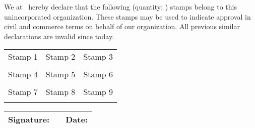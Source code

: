 \documentclass[11pt,a4paper]{article}
\newcommand{\stdsignaturearea}[0]{
    \parbox{\linewidth}{
        \tabcolsep=0pt
        \begin{tabu}{XXX}
            Signature: & & Date:\\
            \hline
        \end{tabu}
    }
}
\begin{document}
We at \uninctomldataATfullname~hereby declare that the following
(quantity: \underline{\hspace{5em}})
stamps belong to this unincorporated organization.
These stamps may be used to indicate approval in civil and commerce terms on behalf of our organization.
All previous similar declarations are invalid since today.

\begin{tabu}{|X|X|X|}
    \hline
    Stamp 1 & Stamp 2 & Stamp 3\\ & &\vspace{32mm} \\
    \hline
    Stamp 4 & Stamp 5 & Stamp 6\\ & &\vspace{32mm} \\
    \hline
    Stamp 7 & Stamp 8 & Stamp 9\\ & &\vspace{32mm} \\
    \hline
\end{tabu}



\vfill
\stdsignaturearea
\end{document}
